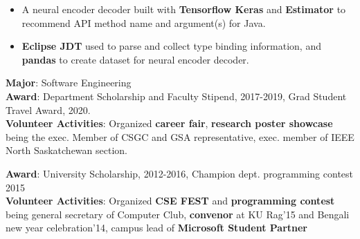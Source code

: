 \documentclass[10pt,a4paper,ragged2e,withhyper]{altacv}
\begin{document}
\begin{paracol}{2}
\begin{itemize}
\item A neural encoder decoder built with \textbf{Tensorflow Keras} and \textbf{Estimator} to recommend API method name and argument(s) for Java.
\item \textbf{Eclipse JDT} used to parse and collect type binding information, and \textbf{pandas} to create dataset for neural encoder decoder.
\end{itemize}



\scriptsize{\textbf{Major}: Software Engineering\\
\textbf{Award}: Department Scholarship and Faculty Stipend, 2017-2019, Grad Student Travel Award, 2020.\\
\textbf{Volunteer Activities}: Organized \textbf{career fair}, \textbf{research poster showcase} being the exec. Member of CSGC and GSA representative, exec. member of IEEE North Saskatchewan section.}

\divider

\scriptsize{\textbf{Award}: University Scholarship, 2012-2016, Champion dept. programming contest 2015\\
\textbf{Volunteer Activities}: Organized \textbf{CSE FEST} and \textbf{programming contest} being general secretary of Computer Club, \textbf{convenor} at KU Rag'15 and Bengali new year celebration'14, campus lead of \textbf{Microsoft Student Partner}}

\end{paracol}
\end{document}
